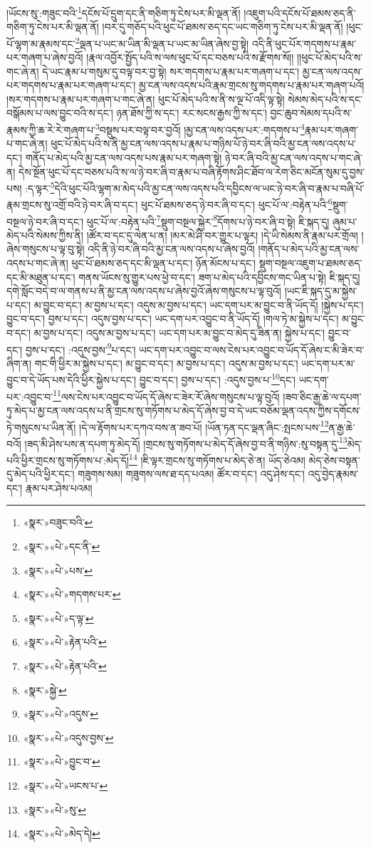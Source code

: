 །ཡོངས་སུ་:གཟུང་བའི་\footnote{«སྣར་»བཟུང་བའི་}དངོས་པོ་དྲུག་དང་ནི་གཅིག་ཏུ་ངེས་པར་མི་ལྡན་ནོ། །འཇུག་པའི་དངོས་པོ་ཐམས་ཅད་ནི་གཅིག་ཏུ་ངེས་པར་མི་ལྡན་ནོ། །བར་དུ་གཅོད་པའི་ཕུང་པོ་ཐམས་ཅད་དང་ཡང་གཅིག་ཏུ་ངེས་པར་མི་ལྡན་ནོ། །ཕུང་པོ་ལྷག་མ་རྣམས་དང་\footnote{«སྣར་»«པེ་»དང་ནི་}ལྡན་པ་ཡང་མ་ཡིན་མི་ལྡན་པ་ཡང་མ་ཡིན་ཞེས་བྱ་སྟེ། འདི་ནི་ཕུང་པོར་གདགས་པ་རྣམ་པར་གཞག་པ་ཞེས་བྱའོ། །རྣལ་འབྱོར་སྤྱོད་པའི་ས་ལས་ཕུང་པོ་དང་བཅས་པའི་ས་རྫོགས་སོ།། །།ཕུང་པོ་མེད་པའི་ས་གང་ཞེ་ན། དེ་ཡང་རྣམ་པ་གསུམ་དུ་བལྟ་བར་བྱ་སྟེ། སར་གདགས་པ་རྣམ་པར་གཞག་པ་དང་། མྱ་ངན་ལས་འདས་པར་གདགས་པ་རྣམ་པར་གཞག་པ་དང་། མྱ་ངན་ལས་འདས་པའི་རྣམ་གྲངས་སུ་གདགས་པ་རྣམ་པར་གཞག་པའོ། །སར་གདགས་པ་རྣམ་པར་གཞག་པ་གང་ཞེ་ན། ཕུང་པོ་མེད་པའི་ས་ནི་ས་ལྔ་པོ་འདི་ལྟ་སྟེ། སེམས་མེད་པའི་ས་དང་བསྒོམས་པ་ལས་བྱུང་བའི་ས་དང་། ཉན་ཐོས་ཀྱི་ས་དང་། རང་སངས་རྒྱས་ཀྱི་ས་དང་། བྱང་ཆུབ་སེམས་དཔའི་ས་རྣམས་ཀྱི་ཆ་རེ་རེ་གཞག་པ་\footnote{«སྣར་»«པེ་»པས་}བསྡུས་པར་བལྟ་བར་བྱའོ། །མྱ་ངན་ལས་འདས་པར་:གདགས་པ་\footnote{«སྣར་»«པེ་»གདགས་པར་}རྣམ་པར་གཞག་པ་གང་ཞེ་ན། ཕུང་པོ་མེད་པའི་ས་ནི་མྱ་ངན་ལས་འདས་པ་རྣམ་པ་གཉིས་པོ་ཉེ་བར་ཞི་བའི་མྱ་ངན་ལས་འདས་པ་དང་། གནོད་པ་མེད་པའི་མྱ་ངན་ལས་འདས་པས་རྣམ་པར་གཞག་སྟེ། ཉེ་བར་ཞི་བའི་མྱ་ངན་ལས་འདས་པ་གང་ཞེ་ན། དེས་སྔོན་ཕུང་པོ་དང་བཅས་པའི་ས་ལ་ཉེ་བར་ཞི་བ་རྣམ་པ་བཞི་རྟོགས་ཤིང་ཐོབ་ལ་རེག་ཅིང་མངོན་སུམ་དུ་བྱས་པས། :ད་ལྟར་\footnote{«སྣར་»«པེ་»ད་ལྟ་}དེའི་ཕུང་པོའི་ལྷག་མ་མེད་པའི་མྱ་ངན་ལས་འདས་པའི་དབྱིངས་ལ་ཡང་ཉེ་བར་ཞི་བ་རྣམ་པ་བཞི་པོ་རྣམ་གྲངས་སུ་འགྲོ་བའི་ཉེ་བར་ཞི་བ་དང་། ཕུང་པོ་ཐམས་ཅད་ཉེ་བར་ཞི་བ་དང་། ཕུང་པོ་ལ་:བརྟེན་པའི་\footnote{«སྣར་»«པེ་»རྟེན་པའི་}སྡུག་བསྔལ་ཉེ་བར་ཞི་བ་དང་། ཕུང་པོ་ལ་:བརྟེན་པའི་\footnote{«སྣར་»«པེ་»རྟེན་པའི་}སྡུག་བསྔལ་སྐྱེར་\footnote{«སྣར་»སྐྱེ་}དོགས་པ་ཉེ་བར་ཞི་བ་སྟེ། ཇི་སྐད་དུ། ཞུམ་པ་མེད་པའི་སེམས་ཀྱིས་ནི། །ཚོར་བ་དང་དུ་ལེན་པ་ན། །མར་མེ་ཤི་བར་གྱུར་པ་ལྟར། །དེ་ཡི་སེམས་ནི་རྣམ་པར་གྲོལ། །ཞེས་གསུངས་པ་ལྟ་བུ་སྟེ། འདི་ནི་ཉེ་བར་ཞི་བའི་མྱ་ངན་ལས་འདས་པ་ཞེས་བྱའོ། །གནོད་པ་མེད་པའི་མྱ་ངན་ལས་འདས་པ་གང་ཞེ་ན། ཕུང་པོ་ཐམས་ཅད་དང་མི་ལྡན་པ་དང་། ཉོན་མོངས་པ་དང་། སྡུག་བསྔལ་འཇུག་པ་ཐམས་ཅད་དང་མི་མཐུན་པ་དང་། གནས་ཡོངས་སུ་གྱུར་པས་ཕྱེ་བ་དང་། ཟག་པ་མེད་པའི་དབྱིངས་གང་ཡིན་པ་སྟེ། ཇི་སྐད་དུ། དགེ་སློང་བདེ་བ་ལ་གནས་པ་ནི་མྱ་ངན་ལས་འདས་པ་ཞེས་བྱའོ་ཞེས་གསུངས་པ་ལྟ་བུའོ། །ཡང་ཇི་སྐད་དུ་མ་སྐྱེས་པ་དང་། མ་བྱུང་བ་དང་། མ་བྱས་པ་དང་། འདུས་མ་བྱས་པ་དང་། ཡང་དག་པར་མ་བྱུང་བ་ནི་ཡོད་དོ། །སྐྱེས་པ་དང་། བྱུང་བ་དང་། བྱས་པ་དང་། འདུས་བྱས་པ་དང་། ཡང་དག་པར་འབྱུང་བ་ནི་ཡོད་དོ། །གལ་ཏེ་མ་སྐྱེས་པ་དང་། མ་བྱུང་བ་དང་། མ་བྱས་པ་དང་། འདུས་མ་བྱས་པ་དང་། ཡང་དག་པར་མ་བྱུང་བ་མེད་དུ་ཟིན་ན། སྐྱེས་པ་དང་། བྱུང་བ་དང་། བྱས་པ་དང་། :འདུས་བྱས་\footnote{«སྣར་»«པེ་»འདུས་}པ་དང་། ཡང་དག་པར་འབྱུང་བ་ལས་ངེས་པར་འབྱུང་བ་ཡོད་དོ་ཞེས་ང་མི་ཟེར་བ་ཞིག་ན། གང་གི་ཕྱིར་མ་སྐྱེས་པ་དང་། མ་བྱུང་བ་དང་། མ་བྱས་པ་དང་། འདུས་མ་བྱས་པ་དང་། ཡང་དག་པར་མ་བྱུང་བ་དེ་ཡོད་པས་དེའི་ཕྱིར་སྐྱེས་པ་དང་། བྱུང་བ་དང་། བྱས་པ་དང་། :འདུས་བྱས་པ་\footnote{«སྣར་»«པེ་»འདུས་བྱས་}དང་། ཡང་དག་པར་:འབྱུང་བ་\footnote{«སྣར་»«པེ་»བྱུང་བ་}ལས་ངེས་པར་འབྱུང་བ་ཡོད་དོ་ཞེས་ང་ཟེར་རོ་ཞེས་གསུངས་པ་ལྟ་བུའོ། །ཟབ་ཅིང་རྒྱ་ཆེ་ལ་དཔག་ཏུ་མེད་པ་མྱ་ངན་ལས་འདས་པ་ནི་གྲངས་སུ་གཏོགས་པ་མེད་དོ་ཞེས་བྱ་བ་དེ་ཡང་བཅོམ་ལྡན་འདས་ཀྱིས་དགོངས་ཏེ་གསུངས་པ་ཡིན་ནོ། །དེ་ལ་རྟོགས་པར་དཀའ་བས་ན་ཟབ་པོ། །ཡོན་ཏན་དང་ལྡན་ཞིང་:སྤངས་པས་\footnote{«སྣར་»«པེ་»ཡངས་པ་}ན་རྒྱ་ཆེ་བའོ། །ཟད་མི་ཤེས་པས་ན་དཔག་ཏུ་མེད་དོ། །གྲངས་སུ་གཏོགས་པ་མེད་དོ་ཞེས་བྱ་བ་ནི་གཉིས་:སུ་བསྟན་དུ་\footnote{«སྣར་»«པེ་»སུ་}མེད་པའི་ཕྱིར་གྲངས་སུ་གཏོགས་པ་:མེད་དོ།\footnote{«སྣར་»«པེ་»མེད་དེ།} །ཇི་ལྟར་གྲངས་སུ་གཏོགས་པ་མེད་ཅེ་ན། ཡོད་ཅེའམ། མེད་ཅེས་བསྟན་དུ་མེད་པའི་ཕྱིར་དང་། གཟུགས་སམ། གཟུགས་ལས་ཐ་དད་པའམ། ཚོར་བ་དང་། འདུ་ཤེས་དང་། འདུ་བྱེད་རྣམས་དང་། རྣམ་པར་ཤེས་པའམ། 